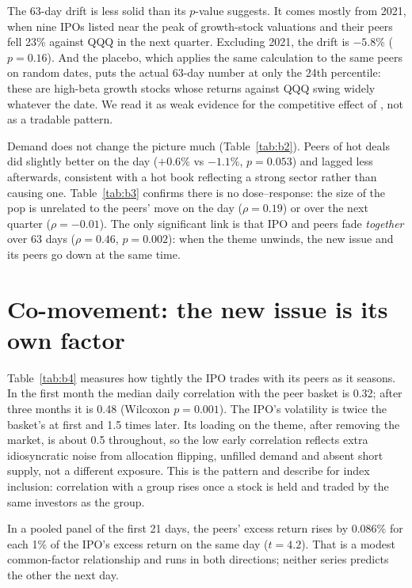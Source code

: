 \documentclass[11pt]{article}
\begin{document}


The 63-day drift is less solid than its $p$-value suggests. It comes mostly from 2021, when nine IPOs listed near the peak of growth-stock valuations and their peers fell 23\% against QQQ in the next quarter. Excluding 2021, the drift is $-5.8\%$ ($p=0.16$). And the placebo, which applies the same calculation to the same peers on random dates, puts the actual 63-day number at only the 24th percentile: these are high-beta growth stocks whose returns against QQQ swing widely whatever the date. We read it as weak evidence for the competitive effect of \citet{hsu2010}, not as a tradable pattern.



Demand does not change the picture much (Table~\ref{tab:b2}). Peers of hot deals did slightly better on the day ($+0.6\%$ vs $-1.1\%$, $p=0.053$) and lagged less afterwards, consistent with a hot book reflecting a strong sector rather than causing one. Table~\ref{tab:b3} confirms there is no dose--response: the size of the pop is unrelated to the peers' move on the day ($\rho=0.19$) or over the next quarter ($\rho=-0.01$). The only significant link is that IPO and peers fade \emph{together} over 63 days ($\rho=0.46$, $p=0.002$): when the theme unwinds, the new issue and its peers go down at the same time.



\section{Co-movement: the new issue is its own factor}
Table~\ref{tab:b4} measures how tightly the IPO trades with its peers as it seasons. In the first month the median daily correlation with the peer basket is 0.32; after three months it is 0.48 (Wilcoxon $p=0.001$). The IPO's volatility is twice the basket's at first and 1.5 times later. Its loading on the theme, after removing the market, is about 0.5 throughout, so the low early correlation reflects extra idiosyncratic noise from allocation flipping, unfilled demand and absent short supply, not a different exposure. This is the pattern \citet{barberis2005} and \citet{greenwood2008} describe for index inclusion: correlation with a group rises once a stock is held and traded by the same investors as the group.



In a pooled panel of the first 21 days, the peers' excess return rises by 0.086\% for each 1\% of the IPO's excess return on the same day ($t=4.2$). That is a modest common-factor relationship and runs in both directions; neither series predicts the other the next day.
\end{document}
